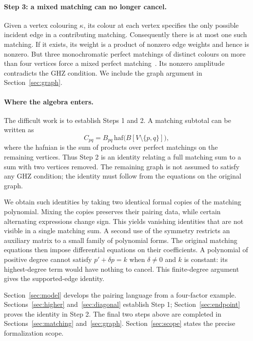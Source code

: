 \documentclass[11pt]{article}
\theoremstyle{definition}
\theoremstyle{plain}
\numberwithin{equation}{section}
\begin{document}
\paragraph{Step 3: a mixed matching can no longer cancel.}
Given a vertex colouring \(\kappa\), its colour at each vertex specifies
the only possible incident edge in a contributing matching. Consequently
there is at most one such matching. If it exists, its weight is a product
of nonzero edge weights and hence is nonzero. But three monochromatic
perfect matchings of distinct colours on more than four vertices force a
mixed perfect matching~\cite[Theorem~7]{cgi}. Its nonzero amplitude
contradicts the GHZ condition. We include the graph argument in
Section~\ref{sec:graph}.

\paragraph{Where the algebra enters.}
The difficult work is to establish Steps 1 and 2. A matching subtotal can be
written as
\[
 C_{pq}=B_{pq}\,\mathrm{haf}\bigl(B[V\setminus\{p,q\}]\bigr),
\]
where the hafnian is the sum of products over perfect matchings on the
remaining vertices. Thus Step 2 is an identity relating a full matching
sum to a sum with two vertices removed. The remaining graph is not assumed
to satisfy any GHZ condition; the identity must follow from the equations
on the original graph.

We obtain such identities by taking two identical formal copies of the
matching polynomial. Mixing the copies preserves their pairing data, while
certain alternating expressions change sign. This yields vanishing
identities that are not visible in a single matching sum. A second use of
the symmetry restricts an auxiliary matrix to a small family of polynomial
forms. The original matching equations then impose differential equations
on their coefficients. A polynomial of positive degree cannot satisfy
\(p'+\delta p=k\) when \(\delta\ne0\) and \(k\) is constant: its
highest-degree term would have nothing to cancel. This finite-degree
argument gives the supported-edge identity.

Section~\ref{sec:model} develops the pairing language from a four-factor
example. Sections~\ref{sec:higher} and~\ref{sec:diagonal} establish Step 1;
Section~\ref{sec:endpoint} proves the identity in Step 2. The final two
steps above are completed in Sections~\ref{sec:matching} and~\ref{sec:graph}.
Section~\ref{sec:scope} states the precise formalization scope.
\end{document}
